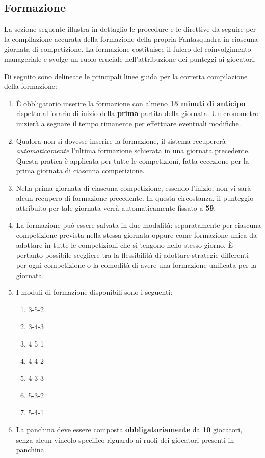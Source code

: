 \documentclass[12pt]{article}
\begin{document}
\subsection{Formazione}

La sezione seguente illustra in dettaglio le procedure e le direttive da seguire per la compilazione accurata della formazione della propria Fantasquadra in ciascuna giornata di competizione. La formazione costituisce il fulcro del coinvolgimento manageriale e svolge un ruolo cruciale nell'attribuzione dei punteggi ai giocatori.

Di seguito sono delineate le principali linee guida per la corretta compilazione della formazione:

\begin{enumerate}
    \item È obbligatorio inserire la formazione con almeno \textbf{15 minuti di anticipo} rispetto all'orario di inizio della \textbf{prima} partita della giornata. Un cronometro inizierà a segnare il tempo rimanente per effettuare eventuali modifiche.
    
    \item Qualora non si dovesse inserire la formazione, il sistema recupererà \textit{automaticamente} l'ultima formazione schierata in una giornata precedente. Questa pratica è applicata per tutte le competizioni, fatta eccezione per la prima giornata di ciascuna competizione.
    
    \item Nella prima giornata di ciascuna competizione, essendo l'inizio, non vi sarà alcun recupero di formazione precedente. In questa circostanza, il punteggio attribuito per tale giornata verrà automaticamente fissato a \textbf{59}.
    
    \item La formazione può essere salvata in due modalità: separatamente per ciascuna competizione prevista nella stessa giornata oppure come formazione unica da adottare in tutte le competizioni che si tengono nello stesso giorno. È pertanto possibile scegliere tra la flessibilità di adottare strategie differenti per ogni competizione o la comodità di avere una formazione unificata per la giornata.

    \item I moduli di formazione disponibili sono i seguenti:
    \begin{enumerate}
        \item 3-5-2
        \item 3-4-3
        \item 4-5-1
        \item 4-4-2
        \item 4-3-3
        \item 5-3-2
        \item 5-4-1
    \end{enumerate}

    \item La panchina deve essere composta \textbf{obbligatoriamente} da \textbf{10} giocatori, senza alcun vincolo specifico riguardo ai ruoli dei giocatori presenti in panchina.

\end{enumerate}
\end{document}
